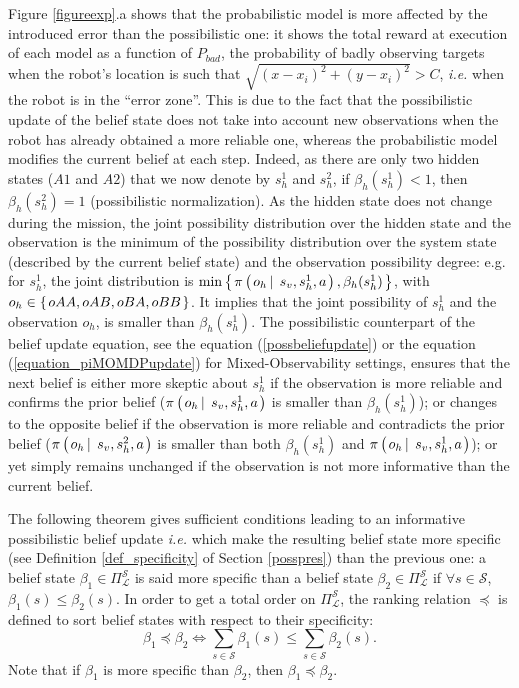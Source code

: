 Figure \ref{figureexp}.a shows that the probabilistic model 
is more affected by the introduced error than the possibilistic one: 
it shows the total reward at execution of each model as a function of $P_{bad}$, 
the probability of badly observing targets 
when the robot's location is such that 
$\sqrt{(x-x_i)^2+(y-x_i)^2} >C$,
\textit{i.e.} when the robot is in the ``error zone''. 
This is due to the fact that the possibilistic update 
of the belief state does not take into account new observations 
when the robot has already obtained a more reliable one, 
whereas the probabilistic model modifies the current belief at each step. 
Indeed, as there are only two hidden states ($A1$ and $A2$)
that we now denote by $s_h^1$ and $s^2_h$, 
if $\beta_{h}(s_{h}^1)<1$, then $\beta_{h}(s_{h}^2)=1$ 
(possibilistic normalization). 
As the hidden state does not change during the mission,
the joint possibility distribution
over the hidden state and the observation 
is the minimum of the possibility distribution over the system state
(described by the current belief state) 
and the observation possibility degree:
e.g. for $s_h^1$, the joint distribution is 
$\min \left\{ \left.  \pi \left( \left.  o_h \, \right| \left. \, s_v,s_h^1, a \right. \right), \beta_h(s_h^1)   \right. \right\}$,
with $o_h \in \left\{ \left.  oAA,oAB,oBA,oBB \right. \right\}$.
It implies that the joint possibility of $s_{h}^1$ 
and the observation $o_h$, 
is smaller than $\beta_{h}(s_{h}^1)$. 
The possibilistic counterpart of the belief update equation,
see the equation (\ref{possbeliefupdate}) or the equation (\ref{equation_piMOMDPupdate})
for Mixed-Observability settings, 
ensures that the next belief is either more skeptic about $s_{h}^1$ 
if the observation is more reliable and confirms the prior belief 
($\pi \left( \left. o_h \, \right| \left. \, s_v,s_h^1,a  \right. \right)$ is smaller than $\beta_{h}(s_{h}^1)$); 
or changes to the opposite belief 
if the observation is more reliable and contradicts 
the prior belief 
($\pi \left( \left. o_h \, \right| \left. \, s_v,s_h^2,a  \right. \right)$ is smaller than both $\beta_{h}(s_{h}^1)$ and $\pi \left( \left. o_h \, \right| \left. \, s_v,s_h^1,a  \right. \right)$); 
or yet simply remains unchanged 
if the observation is not more 
informative than the current belief. 

The following theorem gives sufficient conditions
leading to an informative possibilistic belief update
\textit{i.e.} which make the resulting belief state
more specific (see Definition \ref{def_specificity} of Section \ref{posspres}) 
than the previous one:
a belief state $\beta_1 \in \Pi^{\mathcal{S}}_{\mathcal{L}}$ 
is said more specific than a belief state $\beta_2 \in \Pi^{\mathcal{S}}_{\mathcal{L}}$
if $\forall s \in \mathcal{S}$, $\beta_1(s) \leqslant \beta_2(s)$.
In order to get a total order on $\Pi^{\mathcal{S}}_{\mathcal{L}}$,
the ranking relation $\preceq$ is defined to
sort belief states with respect to their specificity:
\[\beta_1 \preceq \beta_2 \Leftrightarrow \sum_{s \in \mathcal{S}} \beta_1(s) \leqslant \sum_{s \in \mathcal{S}} \beta_2(s).  \]
Note that if $\beta_1$ is more specific than $\beta_2$, 
then $\beta_1 \preceq \beta_2$.

